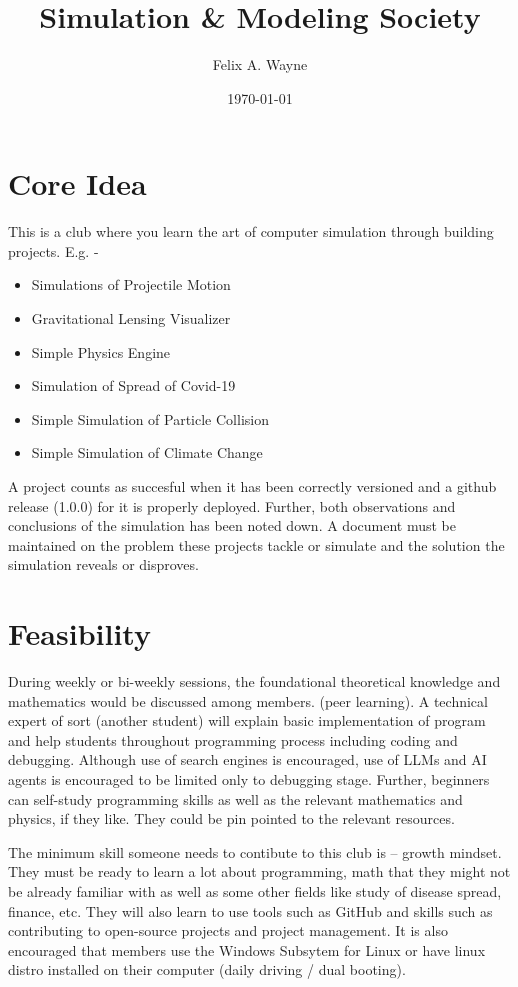 \documentclass{article}
\title{Simulation \& Modeling Society}
\author{Felix A. Wayne}
\date{\today}
\begin{document}
\maketitle
\tableofcontents
\section{Core Idea}
This is a club where you learn the art of computer simulation through building projects. E.g. -
\begin{itemize}
\item Simulations of Projectile Motion
\item Gravitational Lensing Visualizer
\item Simple Physics Engine
\item Simulation of Spread of Covid-19
\item Simple Simulation of Particle Collision
\item Simple Simulation of Climate Change
\end{itemize}

A project counts as succesful when it has been correctly versioned and a github release (1.0.0) for it is properly deployed. Further, both observations and conclusions of the simulation has been noted down. A document must be maintained on the problem these projects tackle or simulate and the solution the simulation reveals or disproves.

\section{Feasibility}
During weekly or bi-weekly sessions, the foundational theoretical knowledge and mathematics would be discussed among members. (peer learning). A technical expert of sort (another student) will explain basic implementation of program and help students throughout programming process including coding and debugging. Although use of search engines is encouraged, use of LLMs and AI agents is encouraged to be limited only to debugging stage. Further, beginners can self-study programming skills as well as the relevant mathematics and physics, if they like. They could be pin pointed to the relevant resources.

The minimum skill someone needs to contibute to this club is -- growth mindset. They must be ready to learn a lot about programming, math that they might not be already familiar with as well as some other fields like study of disease spread, finance, etc. They will also learn to use tools such as GitHub and skills such as contributing to open-source projects and project management. It is also encouraged that members use the Windows Subsytem for Linux or have linux distro installed on their computer (daily driving / dual booting). 
\end{document}
